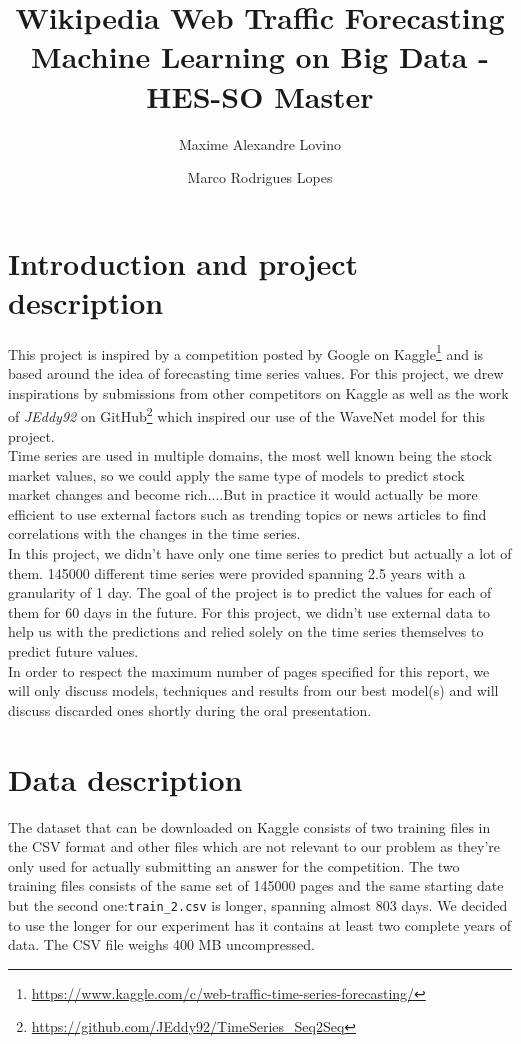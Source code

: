 \documentclass[11pt]{article}
\title{Wikipedia Web Traffic Forecasting\\Machine Learning on Big Data - HES-SO Master}
\author{Maxime Alexandre Lovino \and Marco Rodrigues Lopes}
\begin{document}
    \maketitle
    \section{Introduction and project description}
    This project is inspired by a competition posted by Google on Kaggle\footnote{\url{https://www.kaggle.com/c/web-traffic-time-series-forecasting/}} and is based around the idea of forecasting time series values. For this project, we drew inspirations by submissions from other competitors on Kaggle as well as the work of \emph{JEddy92} on GitHub\footnote{\url{https://github.com/JEddy92/TimeSeries_Seq2Seq}} which inspired our use of the WaveNet model for this project.\\

    Time series are used in multiple domains, the most well known being the stock market values, so we could apply the same type of models to predict stock market changes and become rich....But in practice it would actually be more efficient to use external factors such as trending topics or news articles to find correlations with the changes in the time series.\\

    In this project, we didn't have only one time series to predict but actually a lot of them. 145000 different time series were provided spanning 2.5 years with a granularity of 1 day. The goal of the project is to predict the values for each of them for 60 days in the future. For this project, we didn't use external data to help us with the predictions and relied solely on the time series themselves to predict future values.\\

    In order to respect the maximum number of pages specified for this report, we will only discuss models, techniques and results from our best model(s) and will discuss discarded ones shortly during the oral presentation.
    \newpage
    \section{Data description}
    The dataset that can be downloaded on Kaggle consists of two training files in the CSV format and other files which are not relevant to our problem as they're only used for actually submitting an answer for the competition. The two training files consists of the same set of 145000 pages and the same starting date but the second one:\verb+train_2.csv+ is longer, spanning almost 803 days. We decided to use the longer for our experiment has it contains at least two complete years of data. The CSV file weighs 400 MB uncompressed.\\
\end{document}
